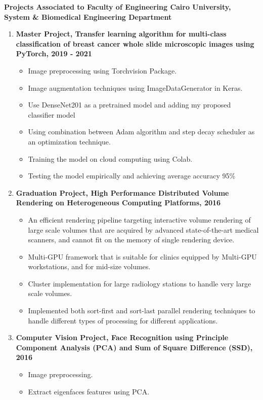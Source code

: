 \documentclass[a4paper,12pt,final]{memoir}
\newcommand{\CVItem}[1]
	{\textbf{\color{RoyalBlue} #1}}
\begin{document}
\clearpage
\framebreak
\framebreak
\CVItem{Projects Associated to Faculty of Engineering Cairo University, System \& Biomedical Engineering Department}
\begin{enumerate}

\item \textbf{Master Project, Transfer learning algorithm for multi-class classification of breast cancer whole slide microscopic images using PyTorch, 2019 - 2021}
\begin{itemize}
\item Image preprocessing using Torchvision Package.
\item Image augmentation techniques using ImageDataGenerator in Keras.
\item Use DenseNet201 as a pretrained model and adding my proposed classifier model
\item Using combination between Adam algorithm and step decay scheduler as an optimization technique.
\item Training the model on cloud computing using Colab.
\item Testing the model empirically and achieving average accuracy 95\%
\end{itemize}
\item \textbf{Graduation Project, High Performance Distributed Volume Rendering on Heterogeneous Computing Platforms, 2016}
\begin{itemize}
\item An efficient rendering pipeline targeting interactive volume rendering of large scale volumes that are acquired by advanced state-of-the-art medical scanners, and cannot fit on the memory of single rendering device.
\item  Multi-GPU framework that is suitable for clinics equipped by Multi-GPU workstations, and for mid-size volumes.
\item Cluster implementation for large radiology stations to handle very large scale volumes.
\item Implemented both sort-first and sort-last parallel rendering techniques to handle different types of processing for different applications.
\end{itemize}
\item \textbf{Computer Vision Project, Face Recognition using Principle Component Analysis (PCA) and Sum of Square Difference (SSD), 2016}
\begin{itemize}
\item Image preprocessing.
\item  Extract eigenfaces features using PCA.

\end{itemize}
\end{enumerate}
\end{document}
